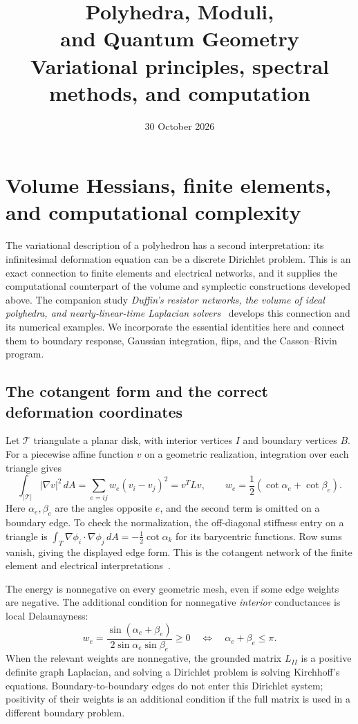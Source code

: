 \documentclass[11pt,a4paper]{article}
\title{\textbf{Polyhedra, Moduli,\\and Quantum Geometry}\\[8pt]
\large Variational principles, spectral methods, and computation}
\author{}
\date{30 October 2026}
\numberwithin{equation}{section}
\theoremstyle{definition}
\theoremstyle{remark}
\begin{document}
\setcounter{section}{8}
\section{Volume Hessians, finite elements, and computational complexity}
\label{sec:ipolybridge}

The variational description of a polyhedron has a second interpretation:
its infinitesimal deformation equation can be a discrete Dirichlet
problem. This is an exact connection to finite elements and electrical
networks, and it supplies the computational counterpart of the volume
and symplectic constructions developed above. The companion study
\emph{Duffin's resistor networks, the volume of ideal polyhedra, and
nearly-linear-time Laplacian solvers}~\cite{IpolyStudy} develops this
connection and its numerical examples. We incorporate the essential
identities here and connect them to boundary response, Gaussian
integration, flips, and the Casson--Rivin program.

\subsection{The cotangent form and the correct deformation coordinates}

Let $\mathcal T$ triangulate a planar disk, with interior vertices $I$
and boundary vertices $B$. For a piecewise affine function $v$ on a
geometric realization, integration over each triangle gives
\begin{equation}
 \int_{|\mathcal T|}|\nabla v|^2\,dA
 =\sum_{e=ij}w_e(v_i-v_j)^2=v^TLv,
 \qquad
 w_e=\frac12(\cot\alpha_e+\cot\beta_e).
 \label{eq:ipolyFEM}
\end{equation}
Here $\alpha_e,\beta_e$ are the angles opposite $e$, and the second
term is omitted on a boundary edge. To check the normalization, the
off-diagonal stiffness entry on a triangle is
$\int_T\nabla\phi_i\cdot\nabla\phi_j\,dA=-\tfrac12\cot\alpha_k$
for its barycentric functions. Row sums vanish, giving the displayed
edge form. This is the cotangent network of the finite element and
electrical interpretations~\cite{DuffinNetworks}.

The energy is nonnegative on every geometric mesh, even if some edge
weights are negative. The additional condition for nonnegative
\emph{interior} conductances is local Delaunayness:
\begin{equation}
 w_e=\frac{\sin(\alpha_e+\beta_e)}
              {2\sin\alpha_e\sin\beta_e}\ge0
 \quad\Longleftrightarrow\quad \alpha_e+\beta_e\le\pi.
 \label{eq:ipolyDelaunayweight}
\end{equation}
When the relevant weights are nonnegative, the grounded matrix $L_{II}$
is a positive definite graph Laplacian, and solving a Dirichlet problem
is solving Kirchhoff's equations. Boundary-to-boundary edges do not enter
this Dirichlet system; positivity of their weights is an additional
condition if the full matrix is used in a different boundary problem.
\end{document}
